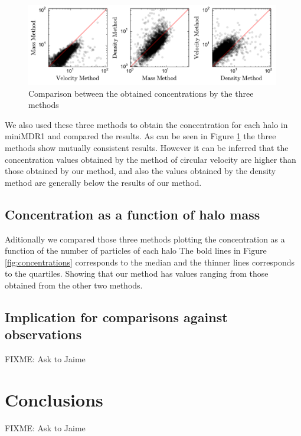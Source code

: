 \documentclass[useAMS,usenatbib]{mn2e}
\begin{document}
\begin{figure}
\begin{center}
  \includegraphics[width=0.99\textwidth]{mass-density-velocity.pdf}
\end{center}
\caption{Comparison between the obtained concentrations by the three methods
    \label{fig:mdv}}
\end{figure}

We also used these three methods to obtain the concentration for each halo in miniMDR1 and compared the results. As can be seen in Figure \ref{fig:mdv} the three methods show mutually consistent results. However it can be inferred that the concentration values ​​obtained by the method of circular velocity are higher than those obtained by our method, and also the values ​​obtained by the density method are generally below the results of our method.

\subsection{Concentration as a function of halo mass}
Aditionally we compared those three methods plotting the concentration as a function of the number of particles of each halo 
%
%
The bold lines in Figure \ref{fig:concentrations} corresponds to the median and the thinner lines corresponds to the quartiles. Showing that our method has values ​​ranging from those obtained from the other two methods.
\subsection{Implication for comparisons against observations}
FIXME: Ask to Jaime


\section{Conclusions}
\label{sec:conclusions}
FIXME: Ask to Jaime



\end{document}
